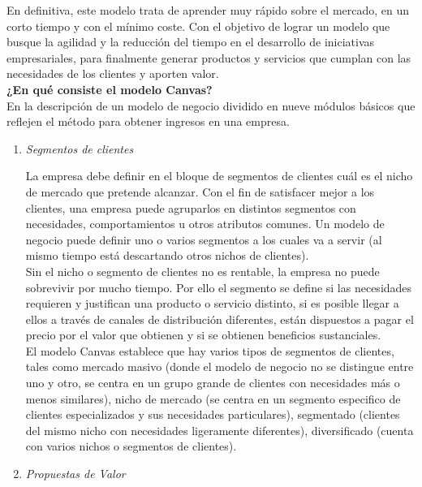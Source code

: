 \documentclass[10pt,a4paper]{article}
\begin{document}
\begin{multicols}{2}
		En definitiva, este modelo trata de aprender muy rápido sobre el mercado, en un corto tiempo y con el mínimo coste.  Con el objetivo de lograr un modelo que busque la agilidad y la reducción del tiempo en el desarrollo de iniciativas empresariales, para finalmente generar productos y servicios que cumplan con las necesidades de los clientes y aporten valor.\\
		
		\textbf{¿En qué consiste el modelo Canvas?}\\
		
		En la descripción de un modelo de negocio dividido en nueve módulos básicos que reflejen el método para obtener ingresos en una empresa.  
		
		\begin{enumerate}[1.]
			\item \textit{Segmentos de clientes}
			
			La empresa debe definir en el bloque de segmentos de clientes cuál es el nicho de mercado que pretende alcanzar. Con el fin de satisfacer mejor a los clientes, una empresa puede agruparlos en distintos segmentos con necesidades, comportamientos u otros atributos comunes. Un modelo de negocio puede definir uno o varios segmentos a los cuales va a servir (al mismo tiempo está descartando otros nichos de clientes).\\
						
			Sin el nicho o segmento de clientes no es rentable, la empresa no puede sobrevivir por mucho tiempo. Por ello el segmento se define si las necesidades requieren y justifican una producto o servicio distinto, si es posible llegar a ellos a través de canales de distribución diferentes, están dispuestos a pagar el precio por el valor que obtienen y si se obtienen beneficios sustanciales.\\
			
			El modelo Canvas establece que hay varios tipos de segmentos de clientes, tales como mercado masivo (donde el modelo de negocio no se distingue entre uno y otro, se centra en un grupo grande de clientes con necesidades más o menos similares), nicho de mercado (se centra en un segmento especifico de clientes especializados y sus necesidades particulares), segmentado (clientes del mismo nicho con necesidades ligeramente diferentes), diversificado (cuenta con varios nichos o segmentos de clientes).
			
			\item \textit{Propuestas de Valor}
			

\end{enumerate}
\end{multicols}
\end{document}
